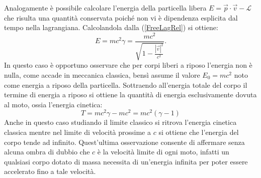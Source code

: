 Analogamente è possibile calcolare l'energia della particella libera $E = \vec{p}\cdot\vec{v}-\mathcal{L} $ che risulta una quantità conservata poiché non vi è dipendenza esplicita dal tempo nella lagrangiana. Calcolandola dalla (\ref{FreeLagRel}) si ottiene:
\begin{equation}
    E = mc^2\gamma=\frac{mc^2}{\sqrt{1-\frac{|\vec{v}|^2}{c^2}}}.\label{energiaRel}
\end{equation}
In questo caso è opportuno osservare che per corpi liberi a riposo l'energia non è nulla, come accade in meccanica classica, bensì assume il valore $E_0=mc^2$ noto come energia a riposo della particella. Sottraendo all'energia totale del corpo il termine di energia a riposo si ottiene la quantità di energia esclusivamente dovuta al moto, ossia l'energia cinetica:
\begin{equation}
    T=mc^2\gamma-mc^2=mc^2(\gamma-1)
\end{equation}
Anche in questo caso studiando il limite classico si ritrova l'energia cinetica classica mentre nel limite di velocità prossime a $c$ si ottiene che l'energia del corpo tende ad infinito. Quest'ultima osservazione consente di affermare senza alcuna ombra di dubbio che $c$ è la velocità limite di ogni moto, infatti un qualsiasi corpo dotato di massa necessita di un'energia infinita per poter essere accelerato fino a tale velocità.\\

